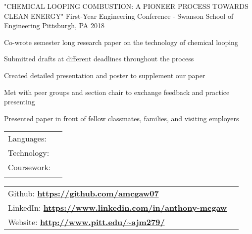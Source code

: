 \documentclass[]{awesome-cv}
\begin{document}
\begin{cventries}
	\cventry
	{"CHEMICAL LOOPING COMBUSTION: A PIONEER PROCESS TOWARDS CLEAN ENERGY"}
	{First-Year Engineering Conference - Swanson School of Engineering}
	{Pittsburgh, PA}
	{2018}
	{\begin{cvitems}
		\item {Co-wrote semester long research paper on the technology of chemical looping}
		\item {Submitted drafts at different deadlines throughout the process}
		\item {Created detailed presentation and poster to supplement our paper}
		\item {Met with peer groups and section chair to exchange feedback and practice presenting }
		\item {Presented paper in front of fellow classmates, families, and visiting employers }
		\end{cvitems}}
	
	\vspace{-3mm}
\end{cventries}
\begin{cventries}
	\cventry
	{}
	{\def\arraystretch{1.15}{\begin{tabular}{ l l }
		Languages:  & {\skill{ Java, C, C++, MIPS, MATLAB, Python, JavaScript, HTML, CSS}} \\
		Technology:  & {\skill{ Microsoft Office, Git/Github, UNIX, Google App Engine, Photoshop}} \\
		Coursework:  & {\skill{ OS(in progress), Web Applications (in Progress), Algorithims, Data Structures, Discrete Mathematics,}} \\
		 		    & {\skill{    Computer Organization, Calculus I-III, Written Professional Communication}} \\
		\end{tabular}}}
	{}
	{}
	{}
\end{cventries}

\vspace{-11mm}
\begin{cventries}
	\cventry
	{}
	{\def\arraystretch{1.20}{\begin{tabular}{ l l }
		Github:		\href{https://github.com/amcgaw07}{\bf 	https://github.com/amcgaw07} \\
		LinkedIn:	\href{https://www.linkedin.com/in/anthony-mcgaw/}{\bf https://www.linkedin.com/in/anthony-mcgaw} \\
		Website:		\href{http://www.pitt.edu/~ajm279/}{\bf 	http://www.pitt.edu/\~{}ajm279/} \\
		\end{tabular}}}
	{}
	{}
	{}
\end{cventries}
\ 
\end{document}

